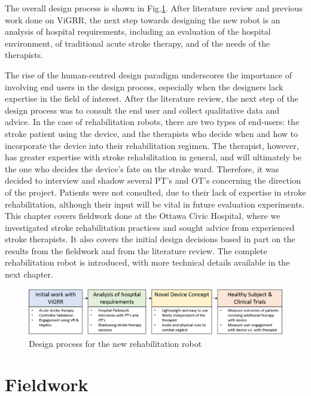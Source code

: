 \documentclass[12pt]{report}
\begin{document}
The overall design process is shown in Fig.\ref{fig:design_diagram}. After literature review and previous work done on ViGRR, the next step towards designing the new robot is an analysis of hospital requirements, including an evaluation of the hospital environment, of traditional acute stroke therapy, and of the needs of the therapists.

	The rise of the human-centred design paradigm underscores the importance of involving end users in the design process, especially when the designers lack expertise in the field of interest. After the literature review, the next step of the design process was to consult the end user and collect qualitative data and advice. In the case of rehabilitation robots, there are two types of end-users: the stroke patient using the device, and the therapists who decide when and how to incorporate the device into their rehabilitation regimen. The therapist, however, has greater expertise with stroke rehabilitation in general, and will ultimately be the one who decides the device's fate on the stroke ward. Therefore, it was decided to interview and shadow several PT's and OT's concerning the direction of the project. Patients were not consulted, due to their lack of expertise in stroke rehabilitation, although their input will be vital in future evaluation experiments.  This chapter covers fieldwork done at the Ottawa Civic Hospital, where we investigated stroke rehabilitation practices and sought advice from experienced stroke therapists. It also covers the initial design decisions based in part on the results from the fieldwork and from the literature review. The complete rehabilitation robot is introduced, with more technical details available in the next chapter.
	
		\begin{figure}[h] 
		\centering
		\includegraphics[width=\linewidth]{design_diagram}
		\caption{Design process for the new rehabilitation robot}
		\label{fig:design_diagram}
	\end{figure}

\section{Fieldwork} 
\end{document}

